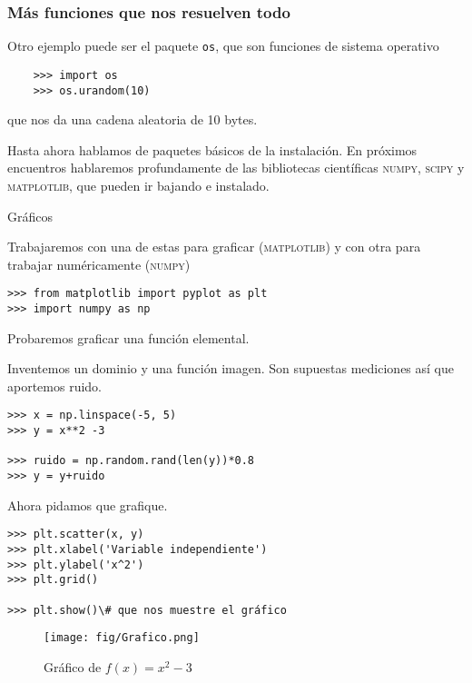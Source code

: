 \documentclass{beamer}
\begin{document}
\begin{frame}[fragile]
\frametitle{Más funciones que nos resuelven todo}
    Otro ejemplo puede ser el paquete \texttt{os}, que son funciones de sistema operativo
    \begin{verbatim}
    >>> import os
    >>> os.urandom(10)
    \end{verbatim}
    que nos da una cadena aleatoria de 10 bytes.

    Hasta ahora hablamos de paquetes básicos de la instalación. En próximos encuentros hablaremos profundamente de las bibliotecas científicas \textsc{numpy}, \textsc{scipy} y \textsc{matplotlib}, que pueden ir bajando e instalado.
\end{frame}


\begin{frame}[fragile]{Gráficos}

Trabajaremos con una de estas para graficar (\textsc{matplotlib})
y con otra para trabajar numéricamente (\textsc{numpy})
\begin{verbatim}
>>> from matplotlib import pyplot as plt
>>> import numpy as np
\end{verbatim}

Probaremos graficar una función elemental.
\end{frame}

\begin{frame}[fragile]

Inventemos un dominio y una función imagen. Son supuestas mediciones así que aportemos ruido.

\begin{verbatim}
>>> x = np.linspace(-5, 5)
>>> y = x**2 -3

>>> ruido = np.random.rand(len(y))*0.8
>>> y = y+ruido
\end{verbatim}
\end{frame}

\begin{frame}[fragile]

Ahora pidamos que grafique.

\begin{verbatim}
>>> plt.scatter(x, y)
>>> plt.xlabel('Variable independiente')
>>> plt.ylabel('x^2')
>>> plt.grid()

>>> plt.show()\# que nos muestre el gráfico
\end{verbatim}
\end{frame}


\begin{frame}[fragile]

\begin{figure}
\centering
\texttt{[image: fig/Grafico.png]}
\caption{Gráfico de $f(x) = x^2-3$}
\label{fig:my_label}
\end{figure}

\end{frame}
\end{document}
